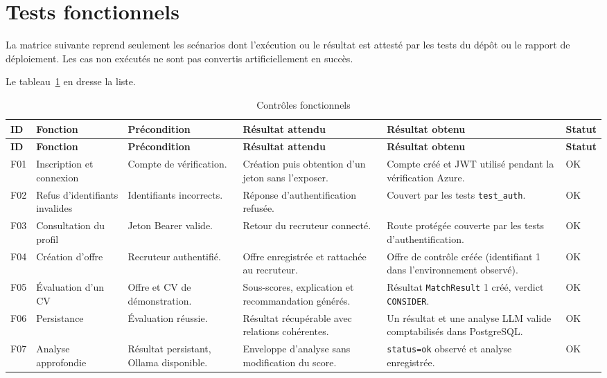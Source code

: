 \section{Tests fonctionnels}

La matrice suivante reprend seulement les scénarios dont l'exécution ou le résultat est attesté par les tests du dépôt ou le rapport de déploiement. Les cas non exécutés ne sont pas convertis artificiellement en succès.

Le tableau~\ref{tab:chap6-functional-matrix} en dresse la liste.

{\scriptsize
\begin{longtable}{|p{}|p{}|p{}|p{}|p{}|p{}|}
\caption{Contrôles fonctionnels}\label{tab:chap6-functional-matrix}\\
\hline
\textbf{ID} & \textbf{Fonction} & \textbf{Précondition} & \textbf{Résultat attendu} & \textbf{Résultat obtenu} & \textbf{Statut}\\
\hline
\endfirsthead
\hline
\textbf{ID} & \textbf{Fonction} & \textbf{Précondition} & \textbf{Résultat attendu} & \textbf{Résultat obtenu} & \textbf{Statut}\\
\hline
\endhead
F01 & Inscription et connexion & Compte de vérification. & Création puis obtention d'un jeton sans l'exposer. & Compte créé et JWT utilisé pendant la vérification Azure. & OK\\
\hline
F02 & Refus d'identifiants invalides & Identifiants incorrects. & Réponse d'authentification refusée. & Couvert par les tests \texttt{test\_auth}. & OK\\
\hline
F03 & Consultation du profil & Jeton Bearer valide. & Retour du recruteur connecté. & Route protégée couverte par les tests d'authentification. & OK\\
\hline
F04 & Création d'offre & Recruteur authentifié. & Offre enregistrée et rattachée au recruteur. & Offre de contrôle créée (identifiant 1 dans l'environnement observé). & OK\\
\hline
F05 & Évaluation d'un CV & Offre et CV de démonstration. & Sous-scores, explication et recommandation générés. & Résultat \texttt{MatchResult} 1 créé, verdict \texttt{CONSIDER}. & OK\\
\hline
F06 & Persistance & Évaluation réussie. & Résultat récupérable avec relations cohérentes. & Un résultat et une analyse LLM valide comptabilisés dans PostgreSQL. & OK\\
\hline
F07 & Analyse approfondie & Résultat persistant, Ollama disponible. & Enveloppe d'analyse sans modification du score. & \texttt{status=ok} observé et analyse enregistrée. & OK\\

\end{longtable}}
